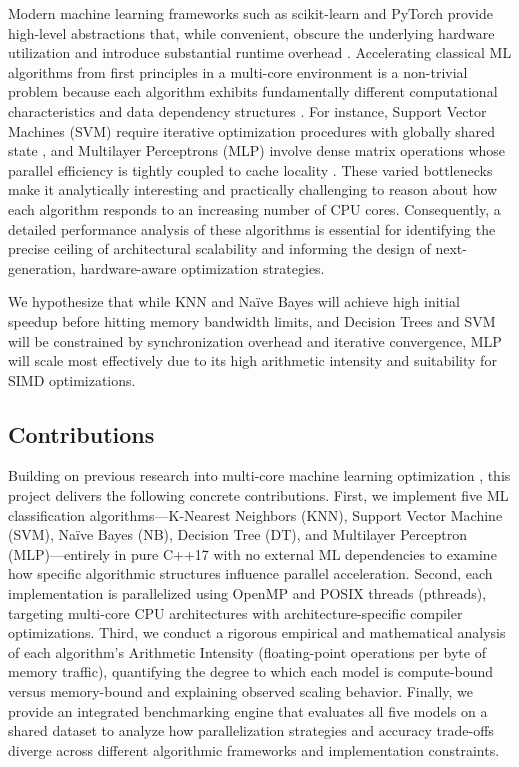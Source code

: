 \documentclass[conference]{IEEEtran}
\begin{document}
Modern machine learning frameworks such as scikit-learn and PyTorch provide high-level abstractions that, while convenient, obscure the underlying hardware utilization and introduce substantial runtime overhead \cite{phani2026stratuminfrastructuremassiveagentcentric, buitinck2013apidesignmachinelearning}. Accelerating classical ML algorithms from first principles in a multi-core environment is a non-trivial problem because each algorithm exhibits fundamentally different computational characteristics and data dependency structures \cite{prevparallelMLwork}. For instance, Support Vector Machines (SVM) require iterative optimization procedures with globally shared state \cite{svmsharedstate}, and Multilayer Perceptrons (MLP) involve dense matrix operations whose parallel efficiency is tightly coupled to cache locality \cite{MLPbottleneck}. These varied bottlenecks make it analytically interesting and practically challenging to reason about how each algorithm responds to an increasing number of CPU cores. Consequently, a detailed performance analysis of these algorithms is essential for identifying the precise ceiling of architectural scalability and informing the design of next-generation, hardware-aware optimization strategies.

We hypothesize that while KNN and Naïve Bayes will achieve high initial speedup before hitting memory bandwidth limits, and Decision Trees and SVM will be constrained by synchronization overhead and iterative convergence, MLP will scale most effectively due to its high arithmetic intensity and suitability for SIMD optimizations.

\subsection{Contributions}

Building on previous research into multi-core machine learning optimization \cite{prevparallelMLwork}, this project delivers the following concrete contributions. First, we implement five ML classification algorithms---K-Nearest Neighbors (KNN), Support Vector Machine (SVM), Naïve Bayes (NB), Decision Tree (DT), and Multilayer Perceptron (MLP)---entirely in pure C++17 with no external ML dependencies to examine how specific algorithmic structures influence parallel acceleration. Second, each implementation is parallelized using OpenMP and POSIX threads (pthreads), targeting multi-core CPU architectures with architecture-specific compiler optimizations. Third, we conduct a rigorous empirical and mathematical analysis of each algorithm's Arithmetic Intensity (floating-point operations per byte of memory traffic), quantifying the degree to which each model is compute-bound versus memory-bound and explaining observed scaling behavior. Finally, we provide an integrated benchmarking engine that evaluates all five models on a shared dataset to analyze how parallelization strategies and accuracy trade-offs diverge across different algorithmic frameworks and implementation constraints.
\end{document}
